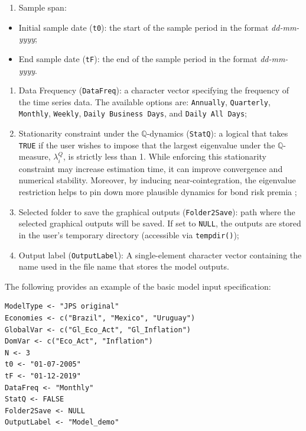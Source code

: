 \begin{enumerate}
\def\labelenumi{\arabic{enumi}.}
\setcounter{enumi}{2}
\tightlist
\item
  Sample span:
\end{enumerate}

\begin{itemize}
\item
  Initial sample date (\texttt{t0}): the start of the sample period in the format \emph{dd-mm-yyyy};
\item
  End sample date (\texttt{tF}): the end of the sample period in the format \emph{dd-mm-yyyy}.
\end{itemize}

\begin{enumerate}
\def\labelenumi{\arabic{enumi}.}
\setcounter{enumi}{3}
\item
  Data Frequency (\texttt{DataFreq}): a character vector specifying the frequency of the time series data. The available options are: \texttt{Annually}, \texttt{Quarterly}, \texttt{Monthly}, \texttt{Weekly}, \texttt{Daily\ Business\ Days}, and \texttt{Daily\ All\ Days};
\item
  Stationarity constraint under the \(\mathbb{Q}\)-dynamics (\texttt{StatQ}): a logical that takes \texttt{TRUE} if the user wishes to impose that the largest eigenvalue under the \(\mathbb{Q}\)-measure, \(\lambda^Q_i\), is strictly less than 1. While enforcing this stationarity constraint may increase estimation time, it can improve convergence and numerical stability. Moreover, by inducing near-cointegration, the eigenvalue restriction helps to pin down more plausible dynamics for bond risk premia \citep{BauerRudebuschWu2012, JoslinPriebschSingleton2014};
\item
  Selected folder to save the graphical outputs (\texttt{Folder2Save}): path where the selected graphical outputs will be saved. If set to \texttt{NULL}, the outputs are stored in the user's temporary directory (accessible via \texttt{tempdir()});
\item
  Output label (\texttt{OutputLabel}): A single-element character vector containing the name used in the file name that stores the model outputs.
\end{enumerate}

The following provides an example of the basic model input specification:

\begin{verbatim}
ModelType <- "JPS original"
Economies <- c("Brazil", "Mexico", "Uruguay")
GlobalVar <- c("Gl_Eco_Act", "Gl_Inflation")
DomVar <- c("Eco_Act", "Inflation")
N <- 3
t0 <- "01-07-2005"
tF <- "01-12-2019"
DataFreq <- "Monthly"
StatQ <- FALSE
Folder2Save <- NULL
OutputLabel <- "Model_demo"
\end{verbatim}

